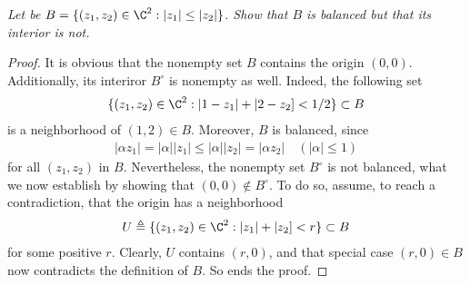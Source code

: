 \textit{Let be %
%
  $B = \{(z_{1}, z_{2}) \in \C^2: |z_{1}| \leq |z_{2}| \}$. %
%
Show that $B$ is balanced but that its interior is not.
}
%
\begin{proof}
It is obvious that the nonempty set $B$ contains the origin $(0,0)$. %
Additionally, its interiror $B^\circ$ is nonempty as well. %
Indeed, the following set %
%
\begin{align}
  \{(z_1, z_2) \in \C^2: |1- z_1| + |2- z_2] < 1/2 \} \subset B %
\end{align}
%
is a neighborhood of $(1, 2) \in B$. %
Moreover, $B$ is balanced, since
\begin{align}
  |\alpha z_1|  = |\alpha| |z_1| \leq  |\alpha| |z_2| = |\alpha z_2| %
  \quad (|\alpha| \leq 1)
\end{align}
%
for all $(z_1, z_2)$ in $B$. %
%
Nevertheless, the nonempty set $B^\circ$ is not balanced, what we now %
establish by showing that $(0, 0) \notin B^\circ$. %
%
To do so, assume, to reach a contradiction, %
that the origin has a neighborhood %
%
\begin{align}
  U \triangleq \{(z_1, z_2) \in \C^2: |z_1| + |z_2] < r \} \subset B %
\end{align}
%
for some positive $r$. Clearly, $U$ contains $(r, 0)$,  %
and that special case $(r, 0) \in B$ now contradicts the definition of $B$. %
So ends the proof.
\end{proof}
